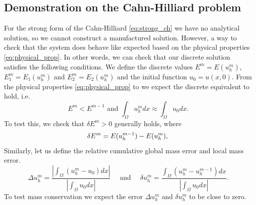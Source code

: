 \documentclass[11pt]{article}
\theoremstyle{remark}
\newcommand{\abs}[1]{\left\lvert #1 \right\rvert}
\numberwithin{equation}{section}
\begin{document}
\subsection{Demonstration on the Cahn-Hilliard problem}%
\label{sub:demonstration_on_the_physical_cahn_hilliard}

For the strong form of the Cahn-Hilliard \eqref{eq:strong_ch} we have no analytical solution, so we cannot construct a manufactured solution. However, a way to check that the system does behave like expected based on the physical properties \eqref{eq:physical_prop}. In other
words, we can check that our discrete solution satisfies the following conditions. We define the discrete values $E^m = E( u_{h}^{m})$, $E_{1}^m = E_{1}( u_{h}^{m})$ and $E_{2}^m = E_{2}( u_{h}^{m})$ and the initial function  $u_{0} = u( x,0) $. From
the physical properties \eqref{eq:physical_prop} to we expect the discrete equivalent to hold, i.e.
\begin{equation}
    E^m   <  E^{ m-1 } \text{ and }   \int_{\Omega }^{} u_{h}^{m}   dx \approx \int_{\Omega }^{} u_{0}  dx.
\end{equation}
To test this, we check that $ \delta E^{m} >0 $ generally holds, where
\begin{equation}
 \delta E^{m} = E( u_{h}^{m-1}) -  E( u_{h}^{m}) ,  \\
\end{equation}
 Similarly, let us define the relative cumulative global mass error and local mass error.
 \begin{equation}
 \Delta u_{h}^{m}  = \frac{ \abs{ \int_{\Omega }^{}  ( u_h^{m} - u_{0} ) dx } }{ \abs{ \int_{\Omega }^{}  u_{0} dx } } \quad \text{ and } \quad
 \delta u_{h}^{m}  = \frac{  \int_{\Omega }^{}  ( u_h^{m} - u^{m-1}_{h} ) dx  }{ \abs{ \int_{\Omega }^{}  u_{0} dx } }.
 \end{equation}
 To test mass conservation we expect the error $\Delta u_{h}^{m}$ and $\delta u_{h}^{m}$   to be close to zero.
\end{document}

